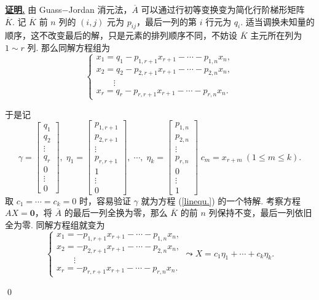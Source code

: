 \documentclass[10pt,openany]{article}
\theoremstyle{thmstyle} %
\theoremstyle{defstyle} %
\theoremstyle{prostyle} %
\theoremstyle{exastyle}
\theoremstyle{remstyle}
\renewenvironment{proof}[1][证明]{\par\underline{\textbf{#1.}} \;\fangsong}{\qed\par}
\begin{document}
\begin{proof}
	由 Guass\(-\)Jordan 消元法，\( \overline{A} \) 可以通过行初等变换变为简化行阶梯形矩阵 \( \overline{K} \). 记 \( \overline{K} \) 前 \( n \) 列的 \( (i,j) \) 元为 \( p_{ij} \)，最后一列的第 \( i \) 行元为 \( q_i \). 适当调换未知量的顺序，这不改变最后的解，只是元素的排列顺序不同，不妨设 \( \overline{K} \) 主元所在列为 \( 1 \sim r \) 列. 那么同解方程组为
	\[ \left\{ \begin{array}{l}
		x_1= q_1-p_{1,r+1}x_{r+1}-\cdots-p_{1,n}x_n, \\
		x_2= q_2-p_{2,r+1}x_{r+1}-\cdots-p_{2,n}x_n, \\
		\qquad \vdots \\
		x_r= q_r-p_{r,r+1}x_{r+1}-\cdots-p_{r,n}x_n. 
	\end{array}\right. \]
	
	于是记
	\[ \gamma=\begin{bmatrix}
		q_1 \\ q_2 \\ \vdots \\ q_r \\ 0  \\ \vdots \\ 0
	\end{bmatrix},\; \eta_1=\begin{bmatrix}
		p_{1,r+1} \\ p_{2,r+1} \\ \vdots \\ p_{r,r+1} \\ 1 \\ \vdots \\ 0
	\end{bmatrix}, \; \cdots, \; \eta_k=\begin{bmatrix}
		p_{1,n} \\ p_{2,n} \\ \vdots \\ p_{r,n} \\ 0 \\ \vdots \\ 1
	\end{bmatrix}  \; c_{m}=x_{r+m} \ ( 1 \leq m \leq k). \]
	取 \( c_1=\cdots=c_k=0 \) 时，容易验证 \( \gamma \) 就为方程 (\ref{linequ.}) 的一个特解. 考察方程 \( AX=\bm{0} \)，将 \( \overline{A} \) 的最后一列全换为零，那么 \( \overline{K} \) 的前 \( n \) 列保持不变，最后一列依旧全为零. 同解方程组就变为
	\[ \left\{ \begin{array}{l}
		x_1= -p_{1,r+1}x_{r+1}-\cdots-p_{1,n}x_n, \\
		x_2= -p_{2,r+1}x_{r+1}-\cdots-p_{2,n}x_n, \\
		\qquad \vdots \\
		x_r= -p_{r,r+1}x_{r+1}-\cdots-p_{r,n}x_n. 
	\end{array}\right. \leadsto X=c_1\eta_1+\cdots+c_k\eta_k. \]
	

\end{proof}
\end{document}
